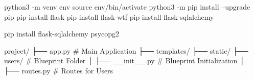 python3 -m venv env
source env/bin/activate
python3 -m pip install --upgrade pip
pip install flask
pip install flask-wtf
pip install flask-sqlalchemy


pip install flask-sqlalchemy psycopg2











project/
├── app.py              # Main Application
├── templates/
├── static/
├── users/              # Blueprint Folder
│   ├── __init__.py     # Blueprint Initialization
│   ├── routes.py       # Routes for Users
